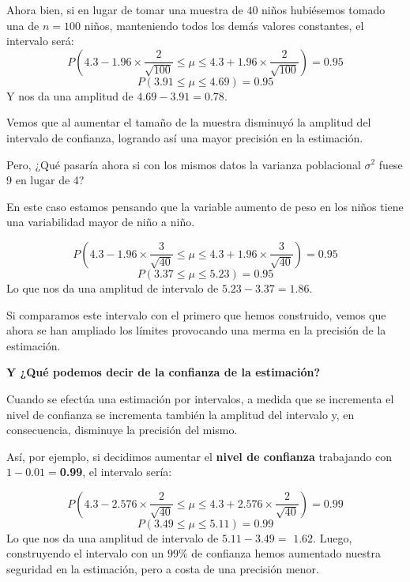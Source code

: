 \documentclass[
  10pt,
  ignorenonframetext,
]{beamer}
\begin{document}
\begin{frame}{}
\protect\hypertarget{section-10}{}
Ahora bien, si en lugar de tomar una muestra de \(40\) niños hubiésemos
tomado una de \(n = 100\) niños, manteniendo todos los demás valores
constantes, el intervalo será:
\[ P\left(4.3 - 1.96 \times \frac{2}{\sqrt{100}}  \le \mu \le 4.3 +1.96 \times \frac{2}{\sqrt{100}} \right)=0.95 \]
\[P(3.91 \le \mu \le 4.69) = 0.95\] Y nos da una amplitud de
\(4.69 - 3.91=0.78\).

Vemos que al aumentar el tamaño de la muestra disminuyó la amplitud del
intervalo de confianza, logrando así una mayor precisión en la
estimación.
\end{frame}

\begin{frame}{}
\protect\hypertarget{section-11}{}
Pero, ¿Qué pasaría ahora si con los mismos datos la varianza poblacional
\(\sigma^2\) fuese 9 en lugar de 4?

En este caso estamos pensando que la variable aumento de peso en los
niños tiene una variabilidad mayor de niño a niño.

\[ P\left(4.3 - 1.96 \times \frac{3}{\sqrt{40}}  \le \mu \le 4.3 +1.96 \times \frac{3}{\sqrt{40}} \right)=0.95 \]
\[P(3.37 \le \mu \le 5.23) = 0.95\] Lo que nos da una amplitud de
intervalo de \(5.23-3.37=1.86\).

Si comparamos este intervalo con el primero que hemos construido, vemos
que ahora se han ampliado los límites provocando una merma en la
precisión de la estimación.
\end{frame}

\begin{frame}{}
\protect\hypertarget{section-12}{}
\textbf{Y ¿Qué podemos decir de la confianza de la estimación?}

Cuando se efectúa una estimación por intervalos, a medida que se
incrementa el nivel de confianza se incrementa también la amplitud del
intervalo y, en consecuencia, disminuye la precisión del mismo.

Así, por ejemplo, si decidimos aumentar el \textbf{nivel de confianza}
trabajando con \(1-0.01=\)\textbf{0.99}, el intervalo sería:

\[ P\left(4.3 - 2.576 \times \frac{2}{\sqrt{40}}  \le \mu \le 4.3 +2.576 \times \frac{2}{\sqrt{40}} \right)=0.99 \]
\[P(3.49 \le \mu \le 5.11) = 0.99\] Lo que nos da una amplitud de
intervalo de \(5.11-3.49=\) \(1.62\). Luego, construyendo el intervalo
con un \(99\%\) de confianza hemos aumentado nuestra seguridad en la
estimación, pero a costa de una precisión menor.
\end{frame}
\end{document}
